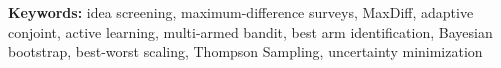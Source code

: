 \documentclass[a4paper,11pt]{article}
\begin{document}

\textbf{Keywords:}
{idea screening, maximum-difference surveys, MaxDiff, adaptive conjoint, active learning, multi-armed bandit, best arm identification, Bayesian bootstrap, best-worst scaling, Thompson Sampling, uncertainty minimization}







\end{document}
